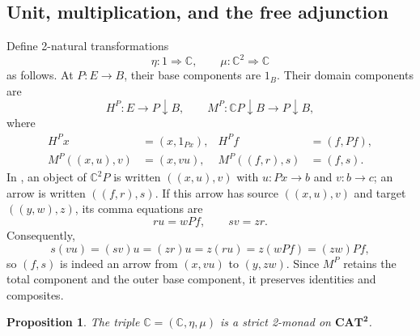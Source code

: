 \documentclass[11pt]{article}
\theoremstyle{plain}
\newtheorem{proposition}[theorem]{Proposition}
\theoremstyle{definition}
\theoremstyle{remark}
\newcommand{\CAT}{\mathbf{CAT}}
\newcommand{\C}{\mathbb{C}}
\numberwithin{equation}{section}
\begin{document}
\subsection{Unit, multiplication, and the free adjunction}

Define 2-natural transformations
\begin{equation*}
\eta\colon1\Rightarrow\C,
  \qquad
  \mu\colon\C^2\Rightarrow\C
\end{equation*}
as follows.  At $P\colon E\to B$, their base components are
$1_B$.  Their domain components are
\begin{equation*}
H^{P}\colon E\longrightarrow P\!\downarrow\!B,
  \qquad
  M^{P}\colon \C P\!\downarrow\!B
      \longrightarrow P\!\downarrow\!B,
\end{equation*}
where
\begin{align}
  H^{P}x&=(x,1_{Px}),
  & H^{P}f&=(f,Pf),
  \label{eq:H-definition}\\
  M^{P}((x,u),v)&=(x,vu),
  & M^{P}((f,r),s)&=(f,s).
  \label{eq:M-definition}
\end{align}
In , an object of $\C^2P$ is written
$((x,u),v)$ with $u\colon Px\to b$ and $v\colon b\to c$; an arrow is
written $((f,r),s)$.
If this arrow has source $((x,u),v)$ and target $((y,w),z)$, its comma
equations are
\begin{equation*}
  ru=wPf,
  \qquad
  sv=zr.
\end{equation*}
Consequently,
\begin{equation*}
  s(vu)=(sv)u=(zr)u=z(ru)=z(wPf)=(zw)Pf,
\end{equation*}
so $(f,s)$ is indeed an arrow from $(x,vu)$ to $(y,zw)$.  Since
$M^P$ retains the total component and the outer base component, it
preserves identities and composites.

\begin{proposition}\label{prop:comma-monad}
The triple $\C=(\C,\eta,\mu)$ is a strict 2-monad on
$\CAT^{\mathbf 2}$.
\end{proposition}
\end{document}
